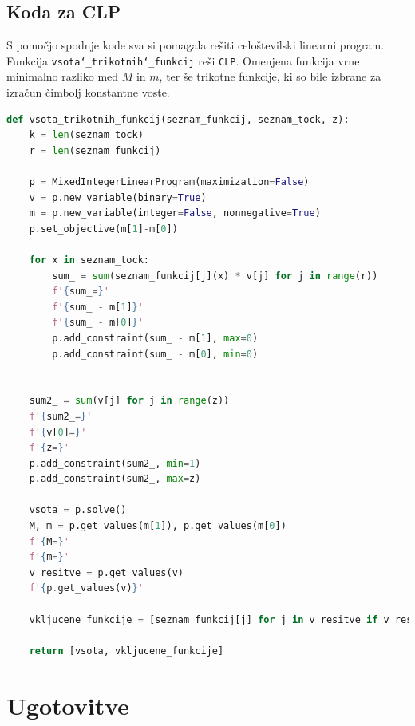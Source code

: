 \documentclass[11pt]{article}
\theoremstyle{definition}
\newcommand{\1}{\mathbbm{1}}
\begin{document}
\subsection{Koda za CLP}
\vspace{0.5cm}

S pomočjo spodnje kode sva si pomagala rešiti celoštevilski linearni program. 
Funkcija \texttt{vsota\char`_trikotnih\char`_funkcij} reši \texttt{CLP}. Omenjena funkcija vrne minimalno razliko med $M$ in $m$, ter še trikotne funkcije, ki so bile izbrane za izračun čimbolj konstantne voste.

\begin{lstlisting}[language=Python]
def vsota_trikotnih_funkcij(seznam_funkcij, seznam_tock, z):
    k = len(seznam_tock)
    r = len(seznam_funkcij)

    p = MixedIntegerLinearProgram(maximization=False)
    v = p.new_variable(binary=True)
    m = p.new_variable(integer=False, nonnegative=True)
    p.set_objective(m[1]-m[0])

    for x in seznam_tock:
        sum_ = sum(seznam_funkcij[j](x) * v[j] for j in range(r))
        f'{sum_=}'
        f'{sum_ - m[1]}'
        f'{sum_ - m[0]}'
        p.add_constraint(sum_ - m[1], max=0)
        p.add_constraint(sum_ - m[0], min=0)


    sum2_ = sum(v[j] for j in range(z))
    f'{sum2_=}'
    f'{v[0]=}'
    f'{z=}'
    p.add_constraint(sum2_, min=1)
    p.add_constraint(sum2_, max=z)

    vsota = p.solve()
    M, m = p.get_values(m[1]), p.get_values(m[0])
    f'{M=}'
    f'{m=}'
    v_resitve = p.get_values(v)
    f'{p.get_values(v)}'

    vkljucene_funkcije = [seznam_funkcij[j] for j in v_resitve if v_resitve[j]==1]

    return [vsota, vkljucene_funkcije]
\end{lstlisting}



\section{Ugotovitve}
\vspace{0.5cm}
\end{document}
